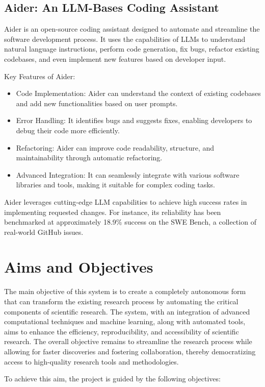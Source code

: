 \subsection{Aider: An LLM-Bases Coding Assistant}
Aider is an open-source coding assistant designed to automate and streamline the software development process. It uses the capabilities of LLMs to understand natural language instructions, perform code generation, fix bugs, refactor existing codebases, and even implement new features based on developer input.

Key Features of Aider:

\begin{itemize}
    \item Code Implementation: Aider can understand the context of existing codebases and add new functionalities based on user prompts.
    \item Error Handling: It identifies bugs and suggests fixes, enabling developers to debug their code more efficiently.
    \item Refactoring: Aider can improve code readability, structure, and maintainability through automatic refactoring.
    \item Advanced Integration: It can seamlessly integrate with various software libraries and tools, making it suitable for complex coding tasks.
\end{itemize}
Aider leverages cutting-edge LLM capabilities to achieve high success rates in implementing requested changes. For instance, its reliability has been benchmarked at approximately 18.9\% success on the SWE Bench, a collection of real-world GitHub issues.

\section{Aims and Objectives}
The main objective of this system is to create a completely autonomous form that can transform the existing research process by automating the critical components of scientific research. The system, with an integration of advanced computational techniques and machine learning, along with automated tools, aims to enhance the efficiency, reproducibility, and accessibility of scientific research. The overall objective remains to streamline the research process while allowing for faster discoveries and fostering collaboration, thereby democratizing access to high-quality research tools and methodologies.

To achieve this aim, the project is guided by the following objectives:

